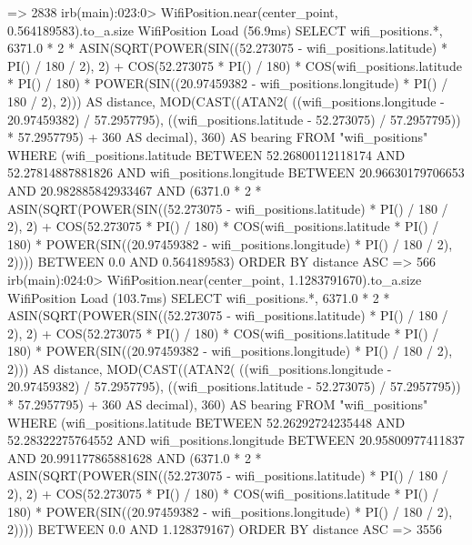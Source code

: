 => 2838
irb(main):023:0> WifiPosition.near(center_point, 0.564189583).to_a.size
  WifiPosition Load (56.9ms)  SELECT wifi_positions.*, 6371.0 * 2 * ASIN(SQRT(POWER(SIN((52.273075 - wifi_positions.latitude) * PI() / 180 / 2), 2) + COS(52.273075 * PI() / 180) * COS(wifi_positions.latitude * PI() / 180) * POWER(SIN((20.97459382 - wifi_positions.longitude) * PI() / 180 / 2), 2))) AS distance, MOD(CAST((ATAN2( ((wifi_positions.longitude - 20.97459382) / 57.2957795), ((wifi_positions.latitude - 52.273075) / 57.2957795)) * 57.2957795) + 360 AS decimal), 360) AS bearing FROM "wifi_positions" WHERE (wifi_positions.latitude BETWEEN 52.26800112118174 AND 52.27814887881826 AND wifi_positions.longitude BETWEEN 20.96630179706653 AND 20.982885842933467 AND (6371.0 * 2 * ASIN(SQRT(POWER(SIN((52.273075 - wifi_positions.latitude) * PI() / 180 / 2), 2) + COS(52.273075 * PI() / 180) * COS(wifi_positions.latitude * PI() / 180) * POWER(SIN((20.97459382 - wifi_positions.longitude) * PI() / 180 / 2), 2)))) BETWEEN 0.0 AND 0.564189583) ORDER BY distance ASC
=> 566
irb(main):024:0> WifiPosition.near(center_point, 1.1283791670).to_a.size
  WifiPosition Load (103.7ms)  SELECT wifi_positions.*, 6371.0 * 2 * ASIN(SQRT(POWER(SIN((52.273075 - wifi_positions.latitude) * PI() / 180 / 2), 2) + COS(52.273075 * PI() / 180) * COS(wifi_positions.latitude * PI() / 180) * POWER(SIN((20.97459382 - wifi_positions.longitude) * PI() / 180 / 2), 2))) AS distance, MOD(CAST((ATAN2( ((wifi_positions.longitude - 20.97459382) / 57.2957795), ((wifi_positions.latitude - 52.273075) / 57.2957795)) * 57.2957795) + 360 AS decimal), 360) AS bearing FROM "wifi_positions" WHERE (wifi_positions.latitude BETWEEN 52.26292724235448 AND 52.28322275764552 AND wifi_positions.longitude BETWEEN 20.95800977411837 AND 20.991177865881628 AND (6371.0 * 2 * ASIN(SQRT(POWER(SIN((52.273075 - wifi_positions.latitude) * PI() / 180 / 2), 2) + COS(52.273075 * PI() / 180) * COS(wifi_positions.latitude * PI() / 180) * POWER(SIN((20.97459382 - wifi_positions.longitude) * PI() / 180 / 2), 2)))) BETWEEN 0.0 AND 1.128379167) ORDER BY distance ASC
=> 3556
